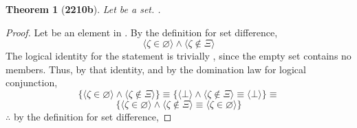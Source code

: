 \documentclass[preview]{standalone}
\newtheorem{theorem}{Theorem}
\begin{document}
\begin{theorem}[\textbf{2210b}]
    Let \bm{$\Xi$} be a set. 
    \bm{$\varnothing - \Xi = \varnothing$}.
\end{theorem}
\begin{proof}
    Let \bm{$\zeta$} be an element in \bm{$\varnothing - \Xi$}. 
    By the definition for set difference,
    \begin{equation*}
        \Big \langle \zeta \in \varnothing \Big \rangle
            \land 
        \Big \langle \zeta \notin \Xi \Big \rangle
    \end{equation*}
    The logical identity for the statement \bm{$\zeta \in \varnothing$} is trivially \bm{$\bot$}, 
    since the empty set contains no members. 
    Thus, by that identity, and by the domination law for logical conjunction,
    \begin{equation*}
        \Bigg\{
            \Big \langle \zeta \in \varnothing \Big \rangle
                \land 
            \Big \langle \zeta \notin \Xi \Big \rangle
        \Bigg\}
            \equiv
        \Bigg\{
            \Big \langle \bot \Big \rangle
                \land 
            \Big \langle \zeta \notin \Xi \Big \rangle 
                \equiv 
            \Big \langle \bot \Big \rangle
        \Bigg\}
            \equiv
    \end{equation*}
    \begin{equation*}
        \Bigg\{
            \Big \langle \zeta \in \varnothing \Big \rangle
                \land 
            \Big \langle \zeta \notin \Xi \Big \rangle
                \equiv
            \Big \langle \zeta \in \varnothing \Big \rangle
        \Bigg\}
    \end{equation*}
    $\therefore$ by the definition for set difference,  
    \bm{$\varnothing - \Xi = \varnothing$}
\end{proof}
\end{document}
